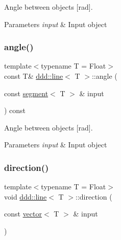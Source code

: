 Angle between objects \mbox{[}rad\mbox{]}. 


\begin{DoxyParams}{Parameters}
{\em input} & Input object \\
\hline
\end{DoxyParams}
\mbox{\label{classddd_1_1line_a2dff36dabec19d440e5e8069cfe830df}} 
\subsubsection{\texorpdfstring{angle()}{angle()}\hspace{0.1cm}{\footnotesize\ttfamily [5/5]}}
{\footnotesize\ttfamily template$<$typename T = Float$>$ \\
const T\& \hyperlink{classddd_1_1line}{ddd\+::line}$<$ T $>$\+::angle (\begin{DoxyParamCaption}\item[{const \hyperlink{classddd_1_1segment}{segment}$<$ T $>$ \&}]{input }\end{DoxyParamCaption}) const\hspace{0.3cm}{\ttfamily [inline]}}



Angle between objects \mbox{[}rad\mbox{]}. 


\begin{DoxyParams}{Parameters}
{\em input} & Input object \\
\hline
\end{DoxyParams}
\mbox{\label{classddd_1_1line_a67a08be8f16587b17cb7a9fb927f9c32}} 
\subsubsection{\texorpdfstring{direction()}{direction()}}
{\footnotesize\ttfamily template$<$typename T = Float$>$ \\
void \hyperlink{classddd_1_1line}{ddd\+::line}$<$ T $>$\+::direction (\begin{DoxyParamCaption}\item[{const \hyperlink{classddd_1_1vector}{vector}$<$ T $>$ \&}]{input }\end{DoxyParamCaption})\hspace{0.3cm}{\ttfamily [inline]}}



